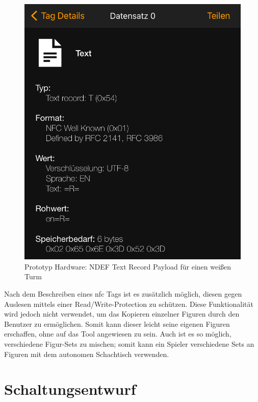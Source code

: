 \begin{figure}
\centering
\includegraphics{images/ndef_record_rook.png}
\caption{Prototyp Hardware: NDEF Text Record Payload für einen weißen
Turm \label{ndef_record_rook}}
\end{figure}

Nach dem Beschreiben eines \gls{nfc} Tags ist es zusätzlich möglich,
diesen gegen Auslesen mittels einer Read/Write-Protection zu schützen.
Diese Funktionalität wird jedoch nicht verwendet, um das Kopieren
einzelner Figuren durch den Benutzer zu ermöglichen. Somit kann dieser
leicht seine eigenen Figuren erschaffen, ohne auf das Tool angewiesen zu
sein. Auch ist es so möglich, verschiedene Figur-Sets zu mischen; somit
kann ein Spieler verschiedene Sets an Figuren mit dem autonomen
Schachtisch verwenden.

\hypertarget{schaltungsentwurf}{%
\section{Schaltungsentwurf}\label{schaltungsentwurf}}

